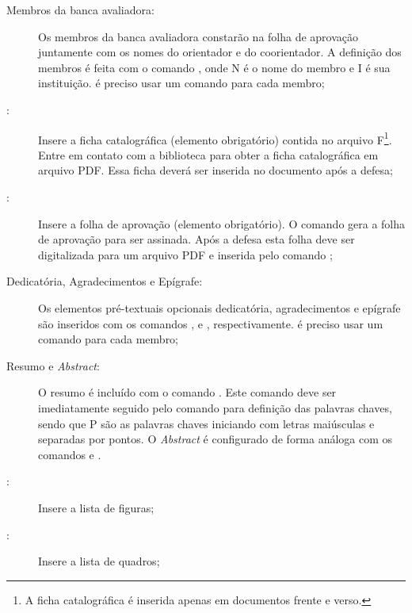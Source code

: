 \begin{description}
\item[Membros da banca avaliadora:] Os membros da banca avaliadora constarão na folha de aprovação juntamente com os nomes do orientador e do coorientador.
A definição dos membros é feita com o comando , onde N é o nome do membro e I é sua instituição.
é preciso usar um comando para cada membro;
\item[:] Insere a ficha catalográfica (elemento obrigatório) contida no arquivo F\footnote{A ficha catalográfica é inserida apenas em documentos frente e verso.}.
Entre em contato com a biblioteca para obter a ficha catalográfica em arquivo PDF.
Essa ficha deverá ser inserida no documento após a defesa;
\item[:] Insere a folha de aprovação (elemento obrigatório).
O comando  gera a folha de aprovação para ser assinada.
Após a defesa esta folha deve ser digitalizada para um arquivo PDF e inserida pelo comando ;
\item[Dedicatória, Agradecimentos e Epígrafe:] Os elementos pré-textuais opcionais dedicatória, agradecimentos e epígrafe são inseridos com os comandos ,  e , respectivamente.
é preciso usar um comando para cada membro;
\item[Resumo e \textit{Abstract}:] O resumo é incluído com o comando . Este comando deve ser imediatamente seguido pelo comando  para definição das palavras chaves, sendo que P são as palavras chaves iniciando com letras maiúsculas e separadas por pontos. O \textit{Abstract} é configurado de forma análoga com os comandos  e .
\item[:] Insere a lista de figuras;
\item[:] Insere a lista de quadros;

\end{description}
